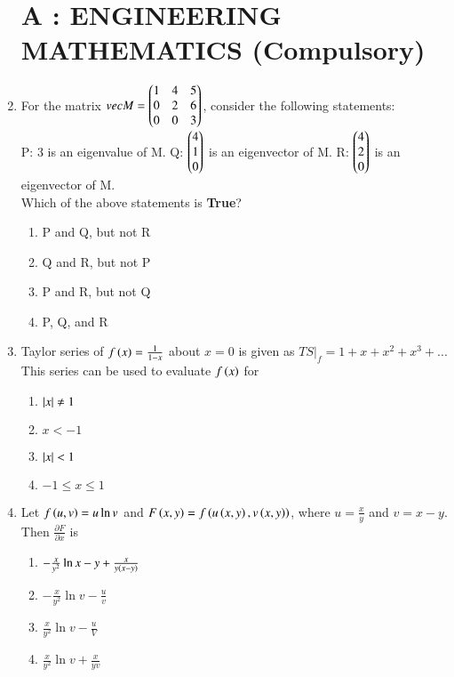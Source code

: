 \documentclass[journal]{IEEEtran}
\numberwithin{equation}{enumi}
\numberwithin{figure}{enumi}
\begin{document}
\begin{enumerate}
\section{A : ENGINEERING MATHEMATICS (Compulsory)}
\item For the matrix $vec{M} = \begin{pmatrix}1 & 4 & 5\\
0 & 2 & 6\\
0 & 0 & 3\end{pmatrix}$, consider the following statements: \\
P: 3 is an eigenvalue of M.   Q: $\begin{pmatrix}4\\
1\\
0\end{pmatrix}$ is an eigenvector of M.   R: $\begin{pmatrix}4\\
2\\
0\end{pmatrix}$ is an eigenvector of M. \\
Which of the above statements is \textbf{True}?
\begin{enumerate}
	\item P and Q, but not R
	\item Q and R, but not P
	\item P and R, but not Q
	\item P, Q, and R
\end{enumerate}
\item Taylor series of $f\left(x\right) = \frac{1}{1 - x}$ about $x = 0$ is given as $TS|_f = 1 + x + x^2 + x^3 + ...$ This series can be used to evaluate $f\left(x\right)$ for
	\begin{enumerate}
		\item $\left\vert x\right\vert \neq 1$
		\item $x < -1$
		\item $\left\vert x\right\vert < 1$
		\item $-1 \leq x \leq 1$
	\end{enumerate}
\item Let $f\left(u, v\right) = u\ln{v}$ and $F\left(x, y\right) = f\left(u\left(x, y\right), v\left(x, y\right)\right)$, where $u = \frac{x}{y}$ and $v = x - y$. Then $\frac{\partial F}{\partial x}$ is
	\begin{enumerate}
		\item $-\frac{x}{y^2}\ln{x - y} + \frac{x}{y\left(x - y\right)}$
		\item $-\frac{x}{y^2}\ln{v} - \frac{u}{v}$
		\item $\frac{x}{y^2}\ln{v} - \frac{u}{V}$
		\item $\frac{x}{y^2}\ln{v} + \frac{x}{yv}$
	\end{enumerate}

\end{enumerate}
\end{document}
